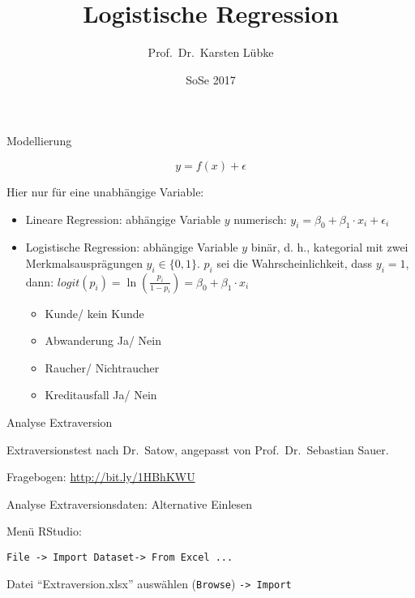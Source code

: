 \documentclass[ignorenonframetext,]{beamer}
\title{Logistische Regression}
\author{Prof.~Dr.~Karsten Lübke}
\date{SoSe 2017}
\providecommand{\tightlist}{%
  \setlength{\itemsep}{0pt}\setlength{\parskip}{0pt}}
\begin{document}
\frame{\titlepage}

\begin{frame}{Modellierung}

\[y=f(x) + \epsilon \]

Hier nur für eine unabhängige Variable:

\begin{itemize}
\tightlist
\item
  Lineare Regression: abhängige Variable \(y\) numerisch:
  \(y_i=\beta_0 + \beta_1 \cdot x_i + \epsilon_i\)
\item
  Logistische Regression: abhängige Variable \(y\) binär, d. h.,
  kategorial mit zwei Merkmalsausprägungen \(y_i \in \{0,1\}\). \(p_i\)
  sei die Wahrscheinlichkeit, dass \(y_i=1\), dann:
  \(logit(p_i)=\ln(\frac{p_i}{1-p_i})=\beta_0 + \beta_1 \cdot x_i\)

  \begin{itemize}
  \tightlist
  \item
    Kunde/ kein Kunde
  \item
    Abwanderung Ja/ Nein
  \item
    Raucher/ Nichtraucher
  \item
    Kreditausfall Ja/ Nein
  \end{itemize}
\end{itemize}

\end{frame}

\begin{frame}{Analyse Extraversion}

Extraversionstest nach Dr.~Satow, angepasst von Prof.~Dr.~Sebastian
Sauer.

Fragebogen: \url{http://bit.ly/1HBhKWU}

\end{frame}

\begin{frame}[fragile]{Analyse Extraversionsdaten: Alternative Einlesen}

Menü RStudio:

\texttt{File\ -\textgreater{}\ Import\ Dataset-\textgreater{}\ From\ Excel\ ...}

Datei ``Extraversion.xlsx'' auswählen (\texttt{Browse})
\texttt{-\textgreater{}\ Import}

\end{frame}
\end{document}
